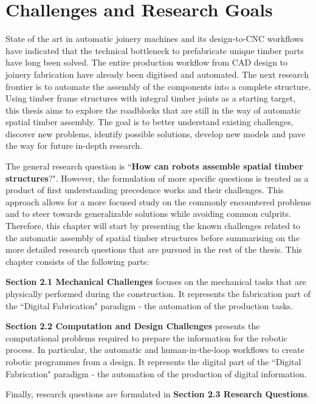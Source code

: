 \chapter{Challenges and Research Goals}
\label{chapter:challenges-and-research-goals}

State of the art in automatic joinery machines and its design-to-CNC workflows have indicated that the technical bottleneck to prefabricate unique timber parts have long been solved. The entire production workflow from CAD design to joinery fabrication have already been digitised and automated. The next research frontier is to automate the assembly of the components into a complete structure. Using timber frame structures with integral timber joints as a starting target, this thesis aims to explore the roadblocks that are still in the way of automatic spatial timber assembly. The goal is to better understand existing challenges, discover new problems, identify possible solutions, develop new models and pave the way for future in-depth research.

The general research question is ``\textbf{How can robots assemble spatial timber structures}?". However, the formulation of more specific questions is treated as a product of first understanding precedence works and their challenges. This approach allows for a more focused study on the commonly encountered problems and to steer towards generalizable solutions while avoiding common culprits. Therefore, this chapter will start by presenting the known challenges related to the automatic assembly of spatial timber structures before summarising on the more detailed research questions that are pursued in the rest of the thesis. This chapter consists of the following parts: 

\textbf{Section 2.1 Mechanical Challenges }focuses on the mechanical tasks that are physically performed during the construction. It represents the fabrication part of the ``Digital Fabrication" paradigm - the automation of the production tasks.

\textbf{Section 2.2 Computation and Design Challenges} presents the computational problems required to prepare the information for the robotic process. In particular, the automatic and human-in-the-loop workflows to create robotic programmes from a design. It represents the digital part of the ``Digital Fabrication" paradigm - the automation of the production of digital information.

Finally, research questions are formulated in \textbf{Section 2.3 Research Questions}. 

